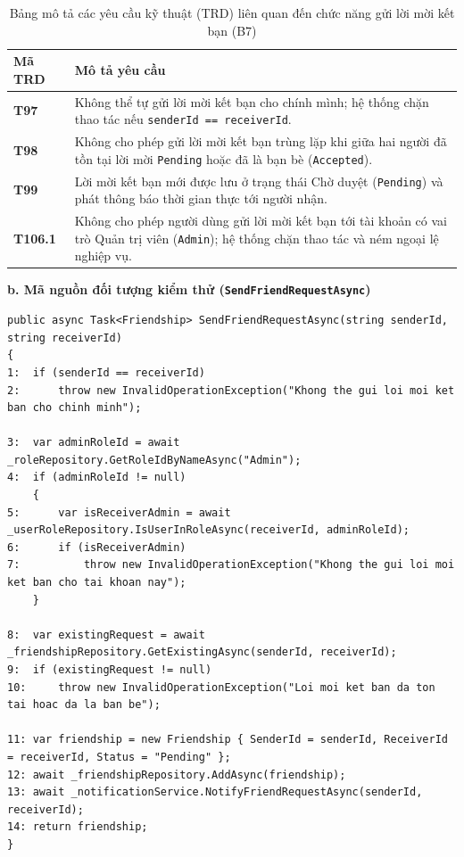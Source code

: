 \documentclass[11pt,a4paper]{article}
\begin{document}
\begin{table}[H]
\centering
\small
\begin{tabularx}{\textwidth}{|C{1.8cm}|X|}
\hline
{}
\textbf{Mã TRD} & \textbf{Mô tả yêu cầu} \tabularnewline
\hline
\textbf{T97} & Không thể tự gửi lời mời kết bạn cho chính mình; hệ thống chặn thao tác nếu \texttt{senderId == receiverId}. \\ \hline
\textbf{T98} & Không cho phép gửi lời mời kết bạn trùng lặp khi giữa hai người đã tồn tại lời mời \texttt{Pending} hoặc đã là bạn bè (\texttt{Accepted}). \\ \hline
\textbf{T99} & Lời mời kết bạn mới được lưu ở trạng thái Chờ duyệt (\texttt{Pending}) và phát thông báo thời gian thực tới người nhận. \\ \hline
\textbf{T106.1} & Không cho phép người dùng gửi lời mời kết bạn tới tài khoản có vai trò Quản trị viên (\texttt{Admin}); hệ thống chặn thao tác và ném ngoại lệ nghiệp vụ. \\ \hline
\end{tabularx}
\caption{Bảng mô tả các yêu cầu kỹ thuật (TRD) liên quan đến chức năng gửi lời mời kết bạn (B7)}
\end{table}

\noindent\textbf{b. Mã nguồn đối tượng kiểm thử (\texttt{SendFriendRequestAsync})}
\begin{lstlisting}[language={[Sharp]C}]
public async Task<Friendship> SendFriendRequestAsync(string senderId, string receiverId)
{
1:  if (senderId == receiverId)
2:      throw new InvalidOperationException("Khong the gui loi moi ket ban cho chinh minh");

3:  var adminRoleId = await _roleRepository.GetRoleIdByNameAsync("Admin");
4:  if (adminRoleId != null)
    {
5:      var isReceiverAdmin = await _userRoleRepository.IsUserInRoleAsync(receiverId, adminRoleId);
6:      if (isReceiverAdmin)
7:          throw new InvalidOperationException("Khong the gui loi moi ket ban cho tai khoan nay");
    }

8:  var existingRequest = await _friendshipRepository.GetExistingAsync(senderId, receiverId);
9:  if (existingRequest != null)
10:     throw new InvalidOperationException("Loi moi ket ban da ton tai hoac da la ban be");

11: var friendship = new Friendship { SenderId = senderId, ReceiverId = receiverId, Status = "Pending" };
12: await _friendshipRepository.AddAsync(friendship);
13: await _notificationService.NotifyFriendRequestAsync(senderId, receiverId);
14: return friendship;
}
\end{lstlisting}
\end{document}
